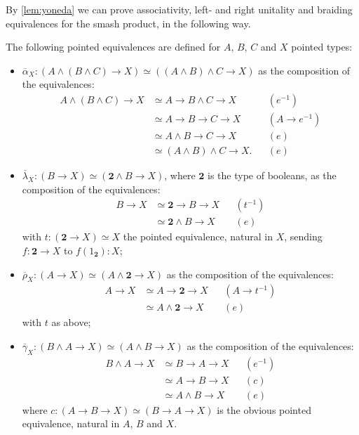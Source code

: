 \documentclass{article}
\renewcommand{\smash}{\wedge}
\newcommand{\sy}{^{-1}}
\newcommand{\alphabar}{\overline{\alpha}}
\newcommand{\rhobar}{\overline{\rho}}
\newcommand{\lambdabar}{\overline{\lambda}}
\newcommand{\gammabar}{\overline{\gamma}}
\newcommand{\two}{\mathbf{2}}
\begin{document}
By \autoref{lem:yoneda} we can prove associativity, left- and right unitality and braiding equivalences for the smash product, in the following way.

\begin{defn}\label{def:equiv-precursors}
	The following pointed equivalences are defined for $A$, $B$, $C$ and $X$ pointed types:
	\begin{itemize}
		\item $\alphabar_X : (A \smash (B \smash C) \to X) \simeq ((A \smash B) \smash C \to X)$ as the composition of the equivalences:
			\begin{align*}
			    A \smash (B \smash C)\to X&\simeq A \to B\smash C\to X && (e\sy)\\
			    &\simeq A \to B\to C\to X && (A \to e\sy)\\
			    &\simeq A \smash B\to C\to X && (e)\\
		    	&\simeq (A \smash B)\smash C\to X. && (e)
			\end{align*}
		\item $\lambdabar_X : (B \to X) \simeq (\two \smash B \to X)$, where $\two$ is the type of booleans, as the composition of the equivalences:
			\begin{align*}
				B \to X &\simeq \two \to B \to X && (t\sy)\\
				&\simeq \two \smash B \to X && (e)
			\end{align*}
			with $t : (\two \to X) \simeq X$ the pointed equivalence, natural in $X$, sending $f : \two \to X$ to $f(1_\two) : X$;
		\item $\rhobar_X : (A \to X) \simeq (A \smash \two \to X)$ as the composition of the equivalences:
			\begin{align*}
				A \to X &\simeq A \to \two \to X && (A \to t\sy)\\
				&\simeq A \smash \two \to X && (e)
			\end{align*}
			with $t$ as above;
		\item $\gammabar_X : (B \smash A \to X) \simeq (A \smash B \to X)$ as the composition of the equivalences:
			\begin{align*}
				B \smash A \to X &\simeq B \to A \to X && (e\sy)\\
				&\simeq A \to B \to X && (c)\\
				&\simeq A \smash B \to X && (e)
			\end{align*}
			where $c : (A \to B \to X) \simeq (B \to A \to X)$ is the obvious pointed equivalence, natural in $A$, $B$ and $X$.
	\end{itemize}
\end{defn}
\end{document}
